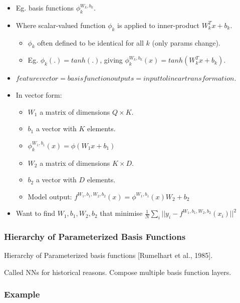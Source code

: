 \documentclass{article}
\begin{document}
\begin{itemize}
    \item Eg. basis functions $\phi_k^{W_k,b_k}$.
    \item Where scalar-valued function $\phi_k$ is applied to inner-product $W_k^T x + b_k$.
    \begin{itemize}
        \item $\phi_k$ often defined to be identical for all $k$ (only params change).
        \item Eg. $\phi_k(.) = tanh(.)$, giving $\phi_k^{W_k,b_k}(x) = tanh(W_k^T x + b_k)$.
    \end{itemize}
    \item $feature vector = basis function outputs = input to linear transformation$.
    \item In vector form:
    \begin{itemize}
        \item $W_1$ a matrix of dimensions $Q \times K$.
        \item $b_1$ a vector with $K$ elements.
        \item $\phi_k^{W_1,b_1}(x) = \phi(W_1 x + b_1)$
        \item $W_2$ a matrix of dimensions $K \times D$.
        \item $b_2$ a vector with $D$ elements.
        \item Model output: $f^{W_1,b_1,W_2,b_2}(x) = \phi^{W_1,b_1}(x)W_2 + b_2$
    \end{itemize}
    \item Want to find $W_1,b_1,W_2,b_2$ that minimise $\frac{1}{N} \sum_i ||y_i - f^{W_1,b_1,W_2,b_2}(x_i)||^2$
\end{itemize}

\subsubsection{Hierarchy of Parameterized Basis Functions}

Hierarchy of Parameterized basis functions [Rumelhart et al., 1985].

Called NNs for historical reasons.
Compose multiple basis function layers.

\subsubsection{Example}
\end{document}
